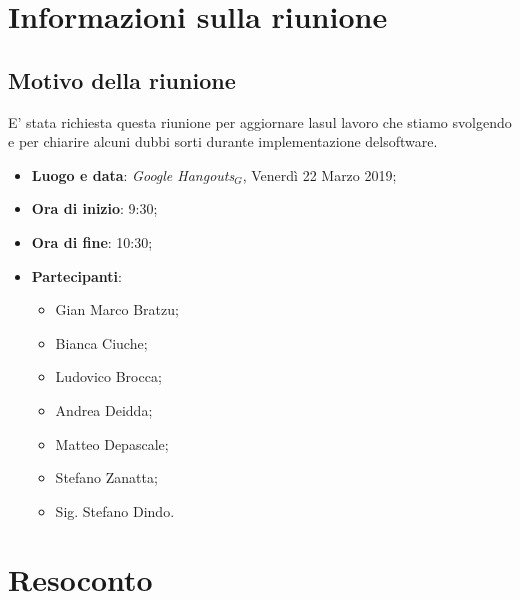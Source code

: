 \documentclass[a4paper,12pt]{article}
\begin{document}
	\section{Informazioni sulla riunione}
	\subsection{Motivo della riunione}E' stata richiesta questa riunione per aggiornare lasul lavoro che stiamo svolgendo e per chiarire alcuni dubbi sorti durante implementazione delsoftware.
	
	\begin{itemize}
		\item \textbf{Luogo e data}: \textit{Google Hangouts$_{G}$}, Venerdì 22 Marzo 2019;
		\item \textbf{Ora di inizio}: 9:30;
		\item \textbf{Ora di fine}: 10:30;
		\item \textbf{Partecipanti}:  
		\begin{itemize}
			\item Gian Marco Bratzu;
			\item Bianca Ciuche;
			\item Ludovico Brocca;
			\item Andrea Deidda;
			\item Matteo Depascale;
			\item Stefano Zanatta;
			\item Sig. Stefano Dindo.
		\end{itemize}
	\end{itemize}
	
	\section{Resoconto}
\end{document}
